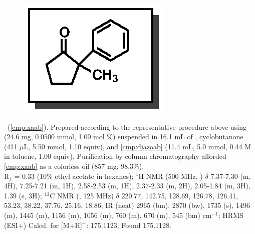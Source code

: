 \vspace{10pt}
\begin{figure}
  \vspace{-25pt}
  \begin{center}
    \includegraphics[scale=0.8]{chp_asymmetric/images/xaab}
  \end{center}
  \vspace{-30pt}
\end{figure}\noindent \textbf{\CMPxaab}\ (\ref{cmp:xaab}). Prepared according to the
representative procedure above using  (24.6 mg, 0.0500 mmol, 1.00 mol \%)
suspended in 16.1 mL of , cyclobutanone (411 $\mu$L, 5.50 mmol, 1.10
equiv), and \ref{cmp:diazoab} (11.4 mL, 5.0 mmol, 0.44 M in toluene,
1.00 equiv).
Purification by column chromatography afforded \ref{cmp:xaab} as a colorless oil
(857 mg, 98.3\%). \\
R$_f$ = 0.33 (10\% ethyl acetate in hexanes); $^1$H NMR (500 MHz, )
$\delta$ 7.37-7.30 (m, 4H), 7.25-7.21 (m, 1H), 2.58-2.53 (m, 1H), 2.37-2.33 (m, 2H), 2.05-1.84
 (m, 3H), 1.39 (s, 3H); $^{13}$C NMR (, 125 MHz) $\delta$ 220.77,
 142.75, 128.69, 126.78, 126.41, 53.23, 38.22, 37.76, 25.16, 18.86; IR (neat)
 2965 (bm), 2870 (bw), 1735 (s), 1496 (m), 1445 (m), 1156 (m), 1056 (m), 760 (m), 670 (m), 545
 (bm) cm$^{-1}$; HRMS (ESI+) Calcd. for  [M+H]$^+$: 175.1123; Found
 175.1128.

